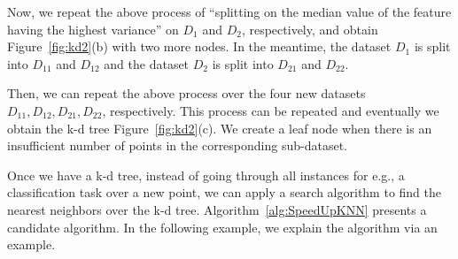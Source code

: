 \begin{example}
Now, we repeat the above process of ``splitting on the median value of the feature having the highest variance'' on $D_1$ and $D_2$, respectively, and obtain Figure~\ref{fig:kd2}(b) with two more nodes. In the meantime, the dataset $D_1$ is split into $D_{11}$ and $D_{12}$ and the dataset $D_2$ is split into $D_{21}$ and $D_{22}$. 

Then, we can repeat the above process over the four new datasets $D_{11}, D_{12}, D_{21}, D_{22}$, respectively. This process can be repeated and eventually we obtain the k-d tree Figure~\ref{fig:kd2}(c). We create a leaf node when there is an insufficient number of points in the corresponding sub-dataset. 
\end{example}


Once we have a k-d tree, instead of going through all instances for e.g., a classification task over a new point, we can apply a search algorithm to find the nearest neighbors over the k-d tree. Algorithm~\ref{alg:SpeedUpKNN} presents a candidate algorithm. In the following example, we explain the algorithm via an example. 

